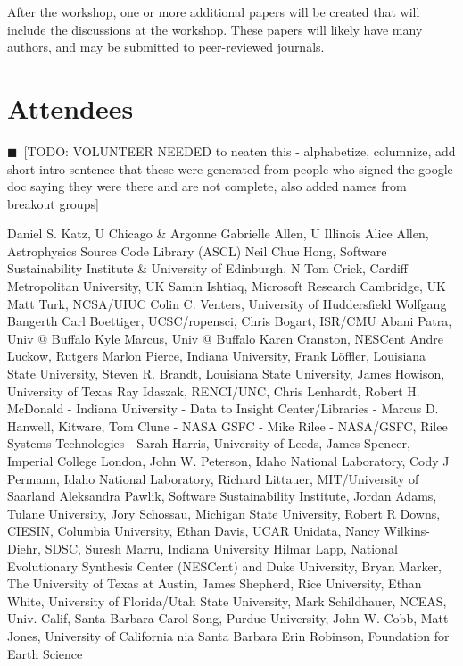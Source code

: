 \documentclass[11pt, oneside]{amsart}
\newcommand{\todo}[1]{{\color{blue}$\blacksquare$~\textsf{[TODO: #1]}}}
\begin{document}
After the workshop, one or more additional papers will be created that will include the discussions at the workshop.  These papers will likely have many authors, and may be submitted to peer-reviewed journals.

\appendix

\section{Attendees}

\todo{VOLUNTEER NEEDED to neaten this - alphabetize, columnize, add short intro sentence that these were generated from people who signed the google doc saying they were there and are not complete, also added names from breakout groups}

Daniel S. Katz, U Chicago \& Argonne
Gabrielle Allen, U Illinois
Alice Allen, Astrophysics Source Code Library (ASCL)
Neil Chue Hong, Software Sustainability Institute \& University of Edinburgh, N 
Tom Crick, Cardiff Metropolitan University, UK
Samin Ishtiaq, Microsoft Research Cambridge, UK
Matt Turk, NCSA/UIUC
Colin C. Venters, University of Huddersfield
Wolfgang Bangerth
Carl Boettiger, UCSC/ropensci,
Chris Bogart, ISR/CMU
Abani Patra, Univ @ Buffalo
Kyle Marcus, Univ @ Buffalo
Karen Cranston, NESCent
Andre Luckow, Rutgers
Marlon Pierce, Indiana University, 
Frank L\"{o}ffler, Louisiana State University,
Steven R. Brandt, Louisiana State University, 
James Howison, University of Texas
Ray Idaszak, RENCI/UNC,
Chris Lenhardt, 
Robert H. McDonald - Indiana University - Data to Insight Center/Libraries - 
Marcus D. Hanwell, Kitware, 
Tom Clune - NASA GSFC - 
Mike Rilee - NASA/GSFC, Rilee Systems Technologies - 
Sarah Harris, University of Leeds, 
James Spencer, Imperial College London,
John W. Peterson, Idaho National Laboratory,
Cody J Permann, Idaho National Laboratory, 
Richard Littauer, MIT/University of Saarland 
Aleksandra Pawlik, Software Sustainability Institute, 
Jordan Adams, Tulane University, 
Jory Schossau, Michigan State University, 
Robert R Downs, CIESIN, Columbia University, 
Ethan Davis, UCAR Unidata, 
Nancy Wilkins-Diehr, SDSC, 
Suresh Marru, Indiana University 
Hilmar Lapp, National Evolutionary Synthesis Center (NESCent) and Duke University, 
Bryan Marker, The University of Texas at Austin,  
James Shepherd, Rice University, 
Ethan White, University of Florida/Utah State University, 
Mark Schildhauer,  NCEAS, Univ. Calif, Santa Barbara
Carol Song, Purdue University, 
John W. Cobb, 
Matt Jones,  University of California nia Santa Barbara
Erin Robinson, Foundation for Earth Science 
\end{document}
